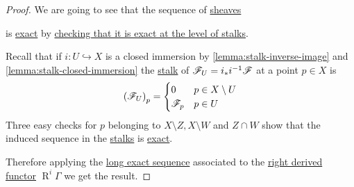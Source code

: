 \documentclass[../../main]{subfiles}
\begin{document}
\begin{proof}
  We are going to see that the sequence of \hyperref[def:sheaf]{sheaves}
  \begin{center}
  \end{center}
  is \hyperref[def:exact-sequence]{exact} by \hyperref[cor:exactness-at-stalks]{checking that it is exact at the level of stalks}.
  
  Recall that if \(i\colon U \hookrightarrow X\) is a closed immersion by \autoref{lemma:stalk-inverse-image} and \autoref{lemma:stalk-closed-immersion} the \hyperref[def:stalk]{stalk} of \(\mathscr{F}_{U} = i_{\ast}i^{-1}\mathscr{F}\) at a point \(p \in X\) is
  \begin{align*}
    \left( \mathscr{F}_{U} \right)_{p} = \begin{cases}
      0 & p \in X \setminus U \\
      \mathscr{F}_{p} & p \in U
    \end{cases}
  \end{align*}
  Three easy checks for \(p\) belonging to \(X \setminus Z, X \setminus W\) and \(Z \cap W\) show that the induced sequence in the \hyperref[def:stalk]{stalks} is \hyperref[def:exact-sequence]{exact}.

  Therefore applying the \hyperref[thm:LES-derived-functor]{long exact sequence} associated to the \hyperref[def:right-derived-functor]{right derived functor} \(\operatorname{R}^{i}\Gamma\) we get the result.
\end{proof}
\end{document}
